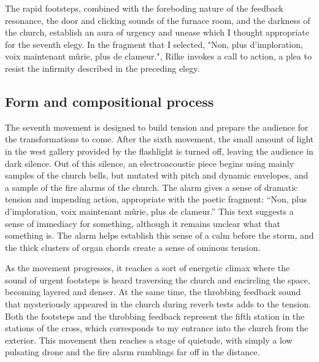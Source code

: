 \documentclass[12pt,twoside,maitrise]{dms_ks}
\theoremstyle{definition}
\begin{document}
{The rapid footsteps, combined with the foreboding nature of the feedback resonance, the door and clicking sounds of the furnace room, and the darkness of the church, establish an aura of urgency and unease which I thought appropriate for the seventh elegy. 
In the fragment that I selected, "Non, plus d’imploration, voix maintenant mûrie, plus de clameur.", Rilke invokes a call to action, a plea to resist the infirmity described in the preceding elegy. 

\subsection{Form and compositional process}

The seventh movement is designed to build tension and prepare the audience for the transformations to come. 
After the sixth movement, the small amount of light in the west gallery provided by the flashlight is turned off, leaving the audience in dark silence. 
Out of this silence, an electroacoustic piece begins using mainly samples of the church bells, but mutated with pitch and dynamic envelopes, and a sample of the fire alarms of the church. 
The alarm gives a sense of dramatic tension and impending action, appropriate with the poetic fragment: “Non, plus d’imploration, voix maintenant mûrie, plus de clameur.” This text suggests a sense of immediacy for something, although it remains unclear what that something is. 
The alarm helps establish this sense of a calm before the storm, and the thick clusters of organ chords create a sense of ominous tension.

As the movement progresses, it reaches a sort of energetic climax where the sound of urgent footsteps is heard traversing the church and encircling the space, becoming layered and denser. 
At the same time, the throbbing feedback sound that mysteriously appeared in the church during reverb tests adds to the tension. 
Both the footsteps and the throbbing feedback represent the fifth station in the stations of the cross, which corresponds to my entrance into the church from the exterior. 
This movement then reaches a stage of quietude, with simply a low pulsating drone and the fire alarm rumblings far off in the distance.

}
\end{document}
